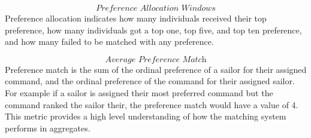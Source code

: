\[\textit{Preference Allocation Windows}\]
Preference allocation indicates how many individuals received their top preference, how many individuals got a top one, top five, and top ten preference, and how many failed to be matched with any preference.

\[\textit{Average Preference Match}\]
Preference match is the sum of the ordinal preference of a sailor for their assigned command, and the ordinal preference of the command for their assigned sailor. For example if a sailor is assigned their most preferred command but the command ranked the sailor their, the preference match would have a value of 4. This metric provides a high level understanding of how the matching system performs in aggregates.


